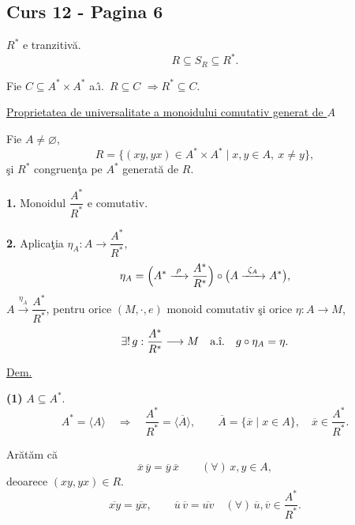 
\subsection*{Curs 12 - Pagina 6}

\noindent $R^*$ e tranzitiv\u{a}.
\[
R\subseteq S_R\subseteq R^*.
\]

\noindent Fie $C\subseteq A^*\times A^*$ a.\^{\i}.\ $R\subseteq C$
$\Rightarrow R^*\subseteq C$.

\bigskip
\noindent\underline{Proprietatea de universalitate a monoidului comutativ generat de $A$}

\medskip
\noindent{}\quad Fie $A\neq\varnothing$,
\[
R=\bigl\{(xy,yx)\in A^*\times A^*\mid x,y\in A,\ x\neq y\bigr\},
\]
\noindent \c{s}i $R^*$ congruen\c{t}a pe $A^*$ generat\u{a} de $R$.

\medskip
\noindent\textbf{1.} Monoidul $\dfrac{A^*}{R^*}$ e comutativ.

\medskip
\noindent\textbf{2.} Aplica\c{t}ia $\eta_A:A\longrightarrow\dfrac{A^*}{R^*}$,
\[
\eta_A=\Bigl(A^*\xrightarrow{\ \rho\ }\frac{A^*}{R^*}\Bigr)
\circ\bigl(A\xrightarrow{\ \zeta_A\ }A^*\bigr),
\]
\noindent $A\xrightarrow{\eta_A}\dfrac{A^*}{R^*}$, pentru orice
$(M,\cdot,e)$ monoid comutativ \c{s}i orice $\eta:A\to M$,
\[
\exists!\,g:\frac{A^*}{R^*}\longrightarrow M
\quad\text{a.\^{\i}.}\quad g\circ\eta_A=\eta.
\]

\bigskip
\noindent\underline{Dem.}

\medskip
\noindent\textbf{(1)} $A\subseteq A^*$.
\[
A^*=\langle A\rangle\quad\Longrightarrow\quad
\frac{A^*}{R^*}=\langle\overline A\rangle,
\qquad \overline A=\{\overline x\mid x\in A\},
\quad\overline x\in\frac{A^*}{R^*}.
\]

\noindent Ar\u{a}t\u{a}m c\u{a}
\[
\overline x\,\overline y=\overline y\,\overline x
\qquad (\forall)\,x,y\in A,
\]
\noindent deoarece $(xy,yx)\in R$.
\[
\overline{xy}=\overline{yx},\qquad
\overline u\,\overline v=\overline{uv}
\quad (\forall)\,\overline u,\overline v\in\frac{A^*}{R^*}.
\]

